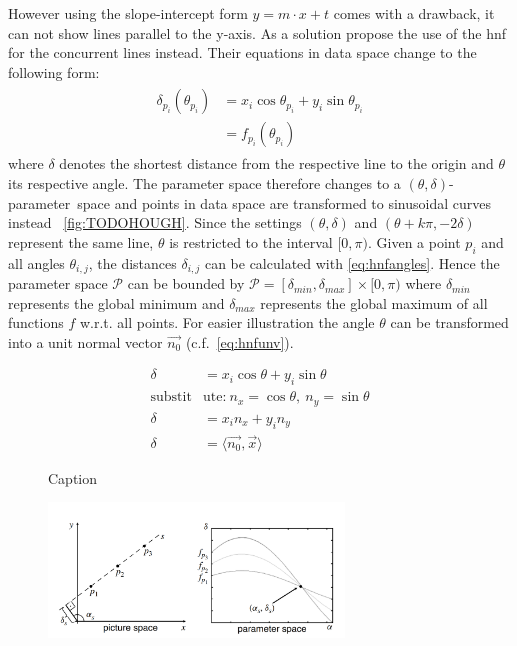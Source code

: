 However using the slope-intercept form $y = m \cdot x + t$ comes with a drawback, it can not show lines parallel to the y-axis. As a solution \citeauthor{duda1971use} propose the use of the \gls{hnf} for the concurrent lines instead. Their equations in data space change to the following form:
\begin{align}\label{eq:hnfangles}
    \begin{split}
        \delta_{p_i}(\theta_{p_i}) &= x_i \cos{\theta_{p_i}} + y_i \sin{\theta_{p_i}}\\
        &= f_{p_i}(\theta_{p_i})
    \end{split}
\end{align}
where $\delta$ denotes the shortest distance from the respective line to the origin and $\theta$ its respective angle. The parameter space therefore changes to a \mbox{$(\theta,\delta)$-parameter space} and points in data space are transformed to sinusoidal curves instead ~\autoref{fig:TODOHOUGH}. Since the settings $(\theta,\delta)$ and $(\theta+k\pi,-2\delta)$ represent the same line, $\theta$ is restricted to the interval $[0,\pi)$. Given a point $p_i$ and all angles $\theta_{i,j}$, the distances $\delta_{i,j}$ can be calculated with \autoref{eq:hnfangles}. Hence the parameter space $\mathcal{P}$ can be bounded by $\mathcal{P} = [\delta_{min}, \delta_{max}]\times [0,\pi)$ where $\delta_{min}$ represents the global minimum and $\delta_{max}$ represents the global maximum of all functions $f$ w.r.t. all points. For easier illustration the angle $\theta$ can be transformed into a unit normal vector $\vec{n_0}$ (c.f.\ \autoref{eq:hnfunv}). 

\begin{align}
    \delta &= x_i \cos{\theta} + y_i \sin{\theta}\nonumber\\
    \text{substit}&\text{ute:}\ n_x = \cos{\theta},\ n_y = \sin{\theta} \nonumber\\
    \delta &= x_i n_x + y_i n_y\nonumber\\
    \label{eq:hnfunv}
    \delta &= \langle\vec{n_0},\vec{x}\rangle 
\end{align}

\begin{figure}
    \centering
    \caption{Caption}
    \label{fig:hnf_euclid}
\end{figure}

\begin{figure}
    \centering
    \includegraphics[width=0.7\textwidth]{figures/TODOHOUGHTHETADIST.png}
    \caption{\cite{CASHachtert2008global}}
    \label{fig:TODOHOUGH}
\end{figure}


